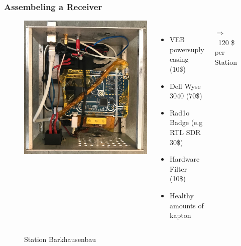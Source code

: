 \documentclass[aspectratio=169]{beamer}
\begin{document}
\begin{frame}
\frametitle{Assembeling a Receiver}

\begin{figure}
\begin{columns}
\begin{center}
\includegraphics[height=0.7\textheight]{figs/station_barkhausen.jpg}
\end{center}
\raggedright
\caption{Station Barkhausenbau}
\vspace{0.5cm}

\begin{itemize}
  \item VEB powersuply casing (10\$)
  \item Dell Wyse 3040 (70\$)
  \item Rad1o Badge (e.g RTL SDR 30\$)
  \item Hardware Filter (10\$)
  \item Healthy amounts of kapton
\end{itemize}

$\Rightarrow$ ~120 \$ per Station

\end{columns}
\end{figure}

\end{frame}
\end{document}
